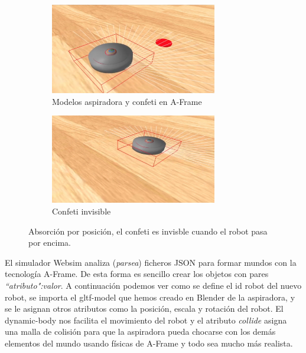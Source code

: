    
\begin{figure}[H]
  \begin{subfigure}[b]{0.5\textwidth}
  \centering
    \includegraphics[width=0.8\textwidth, height=0.5\textwidth]{chapters/images/prototiporoomba.png}
    \caption{Modelos aspiradora y confeti en A-Frame}
    \label{fig:f1}
  \end{subfigure}
  \hfill
  \begin{subfigure}[b]{0.5\textwidth}
  \centering
    \includegraphics[width=0.8\textwidth, height=0.5\textwidth]{chapters/images/prototiporoomba2.png}
	\caption{Confeti invisible}    
    \label{fig:f2}
 
  \end{subfigure}
  \caption{Absorción por posición, el confeti es invisble cuando el robot pasa por encima.}
\end{figure}

El simulador Websim analiza (\textit{parsea}) ficheros JSON para formar mundos con la tecnología A-Frame. De esta forma es sencillo crear los objetos con pares \textit{``atributo":valor}. A continuación podemos ver como se define el id robot del nuevo robot, se importa el gltf-model que hemos creado en Blender de la aspiradora, y se le asignan otros atributos como la posición, escala y rotación del robot. El dynamic-body nos facilita el movimiento del robot y el atributo \textit{collide} asigna una malla de colisión para que la aspiradora pueda chocarse con los demás elementos del mundo usando físicas de A-Frame y todo sea mucho más realista.

